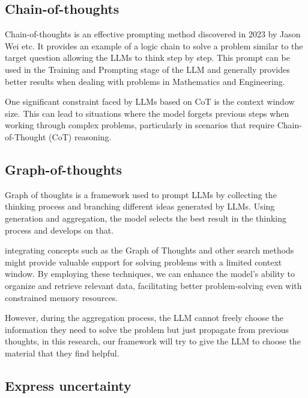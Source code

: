 \documentclass{article}
\begin{document}
\subsection{Chain-of-thoughts}

Chain-of-thoughts \cite{Wei2022ChainOT} is an effective prompting method discovered in 2023 by Jason Wei etc. It provides an example of a logic chain to solve a problem similar to the target question allowing the LLMs to think step by step. This prompt can be used in the Training and Prompting stage of the LLM and generally provides better results when dealing with problems in Mathematics and Engineering.

One significant constraint faced by LLMs based on CoT is the context window size. This can lead to situations where the model forgets previous steps when working through complex problems, particularly in scenarios that require Chain-of-Thought (CoT) reasoning.

\subsection{Graph-of-thoughts}

Graph of thoughts \cite{Besta_2024} is a framework used to prompt LLMs by collecting the thinking process and branching different ideas generated by LLMs. Using generation and aggregation, the model selects the best result in the thinking process and develops on that.  

integrating concepts such as the Graph of Thoughts and other search methods might provide valuable support for solving problems with a limited context window. By employing these techniques, we can enhance the model’s ability to organize and retrieve relevant data, facilitating better problem-solving even with constrained memory resources.

However, during the aggregation process, the LLM cannot freely choose the information they need to solve the problem but just propagate from previous thoughts, in this research, our framework will try to give the LLM to choose the material that they find helpful.

\subsection{Express uncertainty}
\end{document}
